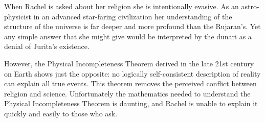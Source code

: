 When Rachel is asked about her religion she is intentionally evasive. As an astro-physicist in
an advanced star-faring civilization her understanding of the structure of the universe is far
deeper and more profound than the Rujaran's. Yet any simple answer that she might give would be
interpreted by the dunari as a denial of Jurita's existence.

However, the Physical Incompleteness Theorem derived in the late 21st century on Earth shows
just the opposite: no logically self-consistent description of reality can explain all true
events. This theorem removes the perceived conflict between religion and science. Unfortunately
the mathematics needed to understand the Physical Incompleteness Theorem is daunting, and Rachel
is unable to explain it quickly and easily to those who ask.
